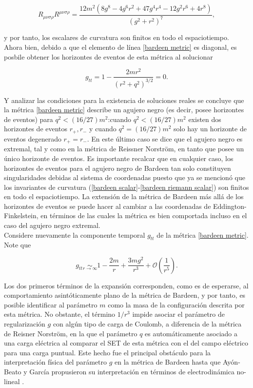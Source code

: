 \documentclass{article}
\numberwithin{equation}{section}
\begin{document}
\begin{equation}
\label{bardeen riemann scalar}
R_{\mu \nu \sigma \rho}R^{\mu \nu \sigma \rho} = \frac{12 m^2 \left(8 g^8-4 g^6 r^2+47 g^4 r^4-12 g^2 r^6+4 r^8\right)}{\left(g^2+r^2\right)^7},
\end{equation}

y por tanto, los escalares de curvatura son finitos en todo el espaciotiempo.\\

Ahora bien, debido a que el elemento de línea \eqref{bardeen metric} es diagonal, es posbile obtener los horizontes de eventos de esta métrica al solucionar

\begin{equation}
g_{tt} = 1 - \frac{2mr^2}{(r^2 + q^2)^{3/2}} = 0.
\end{equation}

Y analizar las condiciones para la existencia de soluciones reales se concluye que la métrica \eqref{bardeen metric} describe un agujero negro (es decir, posee horizontes de eventos) para $q^2 < (16/27)m^2$:cuando $q^2 < (16/27)m^2$ existen dos horizontes de eventos $r_{+},r_{-}$ y cuando $q^2 = (16/27)m^2$ solo hay un horizonte de eventos degenerado $r_{+} = r_{-}$. En este último caso se dice que el agujero negro es extremal, tal y como en la métrica de Reissner Norström, en tanto que posee un único horizonte de eventos. Es importante recalcar que en cualquier caso, los horizontes de eventos para el agujero negro de Bardeen tan solo constituyen singularidades debidas al sistema de coordenadas puesto que ya se mencionó que los invariantes de curvatura (\ref{bardeen scalar}-\ref{bardeen riemann scalar}) son finitos en todo el espaciotiempo. La extensión de la métrica de Bardeen más allá de los horizontes de eventos se puede hacer al cambiar a las coordenadas de Eddington-Finkelstein, en términos de las cuales la métrica es bien comportada incluso en el caso del agujero negro extremal. \\

Considere nuevamente la componente temporal $g_{tt}$ de la métrica \eqref{bardeen metric}. Note que

\begin{equation}
g_{tt} \underset{r \to \infty}{\sim} 1 - \frac{2m}{r} + \frac{3mg^2}{r^3} + \mathcal{O}\left( \frac{1}{r^5} \right).
\end{equation}

Los dos primeros términos de la expansión corresponden, como es de esperarse, al comportamiento asintóticamente plano de la métrica de Bardeen, y por tanto, es posible identificar al parámetro $m$ como la masa de la configuración descrita por esta métrica. No obstante, el término $1/r^3$ impide asociar el parámetro  de regularización $g$ con algún tipo de carga de Coulomb, a diferencia de la métrica de Reisner Norström, en la que el parámetro $q$ es automáticamente asociado a una carga eléctrica al comparar el SET de esta métrica con el del campo eléctrico para una carga puntual. Este hecho fue el principal obstáculo para la interpretación física del parámetro $g$ en la métrica de Bardeen hasta que Ayón-Beato y García propusieron su interpretación en términos de electrodinámica no-lineal \cite{ayon-beato2000}.\\
\end{document}
